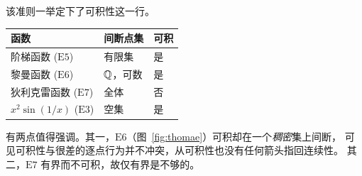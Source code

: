 该准则一举定下了可积性这一行。

\begin{center}
\begin{tabular}{@{}lll@{}}
\toprule
\textbf{函数} & \textbf{间断点集} & \textbf{可积} \\
\midrule
阶梯函数 ($\mathrm{E}5$)        & 有限集         & 是 \\
黎曼函数 ($\mathrm{E}6$)        & $\mathbb{Q}$，可数     & 是 \\
狄利克雷函数 ($\mathrm{E}7$)    & 全体           & 否 \\
$x^2\sin(1/x)$ ($\mathrm{E}3$)  & 空集           & 是 \\
\bottomrule
\end{tabular}
\end{center}

\medskip
有两点值得强调。其一，$\mathrm{E}6$（图~\ref{fig:thomae}）可积却在一个\emph{稠密}集上间断，
可见可积性与很差的逐点行为并不冲突，从可积性也没有任何箭头指回连续性。
其二，$\mathrm{E}7$ 有界而不可积，故仅有界是不够的。


